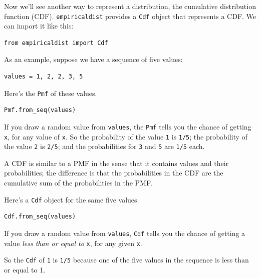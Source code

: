 Now we'll see another way to represent a distribution, the cumulative
distribution function (CDF). \passthrough{\lstinline!empiricaldist!}
provides a \passthrough{\lstinline!Cdf!} object that represents a CDF.
We can import it like this:

\begin{lstlisting}[]
from empiricaldist import Cdf
\end{lstlisting}

As an example, suppose we have a sequence of five values:

\begin{lstlisting}[]
values = 1, 2, 2, 3, 5  
\end{lstlisting}

Here's the \passthrough{\lstinline!Pmf!} of these values.

\begin{lstlisting}[]
Pmf.from_seq(values)
\end{lstlisting}

If you draw a random value from \passthrough{\lstinline!values!}, the
\passthrough{\lstinline!Pmf!} tells you the chance of getting
\passthrough{\lstinline!x!}, for any value of
\passthrough{\lstinline!x!}. So the probability of the value
\passthrough{\lstinline!1!} is \passthrough{\lstinline!1/5!}; the
probability of the value \passthrough{\lstinline!2!} is
\passthrough{\lstinline!2/5!}; and the probabilities for
\passthrough{\lstinline!3!} and \passthrough{\lstinline!5!} are
\passthrough{\lstinline!1/5!} each.

A CDF is similar to a PMF in the sense that it contains values and their
probabilities; the difference is that the probabilities in the CDF are
the cumulative sum of the probabilities in the PMF.

Here's a \passthrough{\lstinline!Cdf!} object for the same five values.

\begin{lstlisting}[]
Cdf.from_seq(values)
\end{lstlisting}

If you draw a random value from \passthrough{\lstinline!values!},
\passthrough{\lstinline!Cdf!} tells you the chance of getting a value
\emph{less than or equal to} \passthrough{\lstinline!x!}, for any given
\passthrough{\lstinline!x!}.

So the \passthrough{\lstinline!Cdf!} of \passthrough{\lstinline!1!} is
\passthrough{\lstinline!1/5!} because one of the five values in the
sequence is less than or equal to 1.

